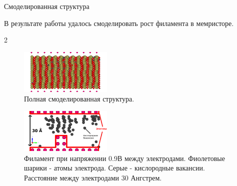 \documentclass{beamer}%
\begin{document}




    




\begin{frame}{Смоделированная структура}{}

В результате работы удалось смоделировать рост филамента в мемристоре.

\begin {multicols} {2}

\begin{figure}
    \centering
    \includegraphics[height=80px]{img/11000_full_ex.pdf}
    \caption{Полная смоделированная структура.
    }
\end{figure}
\columnbreak

\begin{figure}
    \centering
    \includegraphics[height=80px]{img/11000_ex.pdf}
    \caption{Филамент при напряжении 0.9В между электродами.
    Фиолетовые шарики - атомы электрода.
    Серые - кислородные вакансии.
    Расстояние между электродами 30 Ангстрем.
    }
\end{figure}

\end{multicols}
\end{frame}
\end{document}
